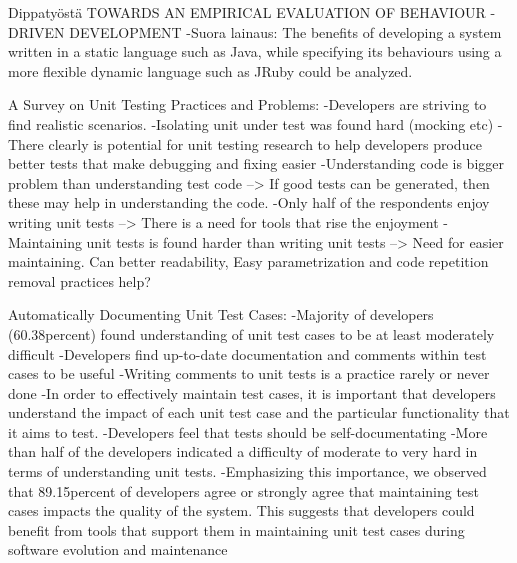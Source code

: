     Dippatyöstä TOWARDS AN EMPIRICAL EVALUATION
                OF BEHAVIOUR - DRIVEN DEVELOPMENT\newline
    -Suora lainaus: The benefits of developing a system written in a static language such as Java, while specifying its
     behaviours using a more flexible dynamic language such as JRuby could be analyzed.\newline\newline

    A Survey on Unit Testing Practices and Problems:\newline
    -Developers are striving to find realistic scenarios.\newline
    -Isolating unit under test was found hard (mocking etc)\newline
    -There clearly is potential for unit testing research to help developers produce better tests that make debugging and fixing easier\newline
    -Understanding code is bigger problem than understanding test code\newline
    --> If good tests can be generated, then these may help in understanding the code.\newline
    -Only half of the respondents enjoy writing unit tests\newline
    --> There is a need for tools that rise the enjoyment\newline
    -Maintaining unit tests is found harder than writing unit tests\newline
    --> Need for easier maintaining. Can better readability, Easy parametrization and code repetition removal practices help?\newline\newline

    Automatically Documenting Unit Test Cases:\newline
    -Majority of developers (60.38percent) found understanding of unit test cases to be at least moderately difficult\newline
    -Developers find up-to-date documentation and comments within test cases to be useful\newline
    -Writing comments to unit tests is a practice rarely or never done\newline
    -In order to effectively maintain test cases, it is important that developers understand the impact of each unit
     test case and the particular functionality that it aims to test.\newline
    -Developers feel that tests should be self-documentating\newline
    -More than half of the developers indicated a difficulty of moderate to very hard in terms of understanding unit tests.\newline
    -Emphasizing this importance, we observed that 89.15percent of developers agree or strongly agree that maintaining test cases
      impacts the quality of the system. This suggests that developers could benefit from tools that support them in maintaining unit test
       cases during software evolution and maintenance\newline\newline

